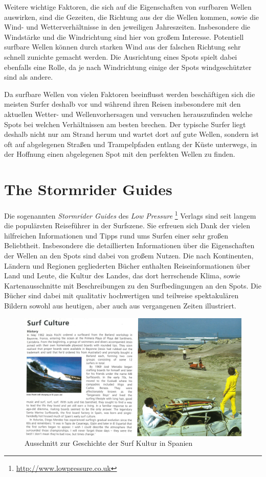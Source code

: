 Weitere wichtige Faktoren, die sich auf die Eigenschaften von
surfbaren Wellen auswirken, sind die Gezeiten, die Richtung aus der
die Wellen kommen, sowie die Wind- und Wetterverhältnisse in den
jeweiligen Jahreszeiten. Insbesondere die Windstärke und die
Windrichtung sind hier von großem Interesse. Potentiell surfbare
Wellen können durch starken Wind aus der falschen Richtung sehr
schnell zunichte gemacht werden. Die Ausrichtung eines Spots spielt
dabei ebenfalls eine Rolle, da je nach Windrichtung einige der Spots
windgeschützter sind als andere.

Da surfbare Wellen von vielen Faktoren beeinflusst werden beschäftigen
sich die meisten Surfer deshalb vor und während ihren Reisen
insbesondere mit den aktuellen Wetter- und Wellenvorhersagen und
versuchen herauszufinden welche Spots bei welchen Verhältnissen am
besten brechen. Der typische Surfer liegt deshalb nicht nur am Strand
herum und wartet dort auf gute Wellen, sondern ist oft auf abgelegenen
Straßen und Trampelpfaden entlang der Küste unterwegs, in der Hoffnung
einen abgelegenen Spot mit den perfekten Wellen zu finden.

\section{The Stormrider Guides}
Die sogenannten \textit{Stormrider Guides} des \textit{Low Pressure}
\footnote{\url{http://www.lowpressure.co.uk}} Verlags sind seit langem
die populärsten Reiseführer in der Surfszene. Sie erfreuen sich Dank
der vielen hilfreichen Informationen und Tipps rund ums Surfen einer
sehr großen Beliebtheit. Insbesondere die detaillierten Informationen
über die Eigenschaften der Wellen an den Spots sind dabei von großem
Nutzen. Die nach Kontinenten, Ländern und Regionen gegliederten Bücher
enthalten Reiseinformationen über Land und Leute, die Kultur des
Landes, das dort herrschende Klima, sowie Kartenausschnitte mit
Beschreibungen zu den Surfbedingungen an den Spots. Die Bücher sind
dabei mit qualitativ hochwertigen und teilweise spektakulären Bildern
sowohl aus heutigen, aber auch aus vergangenen Zeiten illustriert.

\begin{figure}[h]
  \includegraphics[width=\textwidth]{bilder/surf-culture}
  \caption{Ausschnitt zur Geschichte der Surf Kultur in Spanien}
  \label{surf-culture}
\end{figure}

